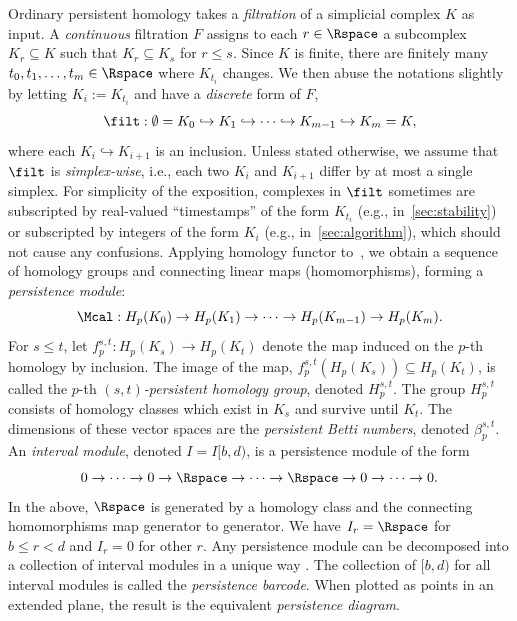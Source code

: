 Ordinary persistent homology takes a \emph{filtration} of a simplicial complex $K$ as input. A \emph{continuous}  filtration $F$  assigns to each $r\in \Rspace$ a subcomplex $K_r \subseteq K$ such that  $K_r \subseteq K_s$ for $r \leq s$. 
Since $K$ is finite, there are finitely many  $t_0,t_1, \ldots, t_m \in \Rspace$ where $K_{t_i}$ changes. 
 We then abuse the notations slightly by
letting $K_i := K_{t_i}$ and have a \emph{discrete} form of $F$,
\begin{equation}
\label{eq:fcomplex}
    \filt:\emptyset = K_0 \hookrightarrow K_1 \hookrightarrow \cdots \hookrightarrow K_{m-1} \hookrightarrow K_m=K,
\end{equation}
where
each $K_i \hookrightarrow K_{i+1}$ is an inclusion. 
Unless stated otherwise, we assume that $\filt$ is \emph{simplex-wise}, i.e., each 
two 
$K_i$ and $K_{i+1}$ differ by at most a single simplex. 
For simplicity of the exposition,
complexes in $\filt$ sometimes are
subscripted by real-valued ``timestamps'' of the form $K_{t_i}$ (e.g., in~\cref{sec:stability}) or subscripted by integers of the form $K_i$ (e.g., in~\cref{sec:algorithm}), which  should not cause any confusions.
Applying homology functor to~, we obtain a sequence of homology groups and connecting linear maps (homomorphisms), forming a \emph{persistence module}:
\begin{equation}\label{eq:fhomology}
\Mcal: H_p(K_0) \to H_p(K_1) \to  \cdots \to H_p(K_{m-1}) \to H_p(K_m).   
\end{equation} 
For $s\leq t$, let $f^{s,t}_p: H_p(K_s) \rightarrow H_p(K_t)$ denote the map induced on the $p$-th homology by  inclusion.
The image of the map, $f^{s,t}_p(H_p(K_s)) \subseteq H_p(K_t)$, is called the $p$-th \emph{$(s,t)$-persistent homology group}, denoted $H_p^{s,t}$. The group $H_p^{s,t}$
consists of homology classes which exist in $K_s$ and survive until $K_t$. The dimensions of these vector spaces are the \emph{persistent Betti numbers}, denoted $\beta^{s,t}_p$.
An \emph{interval module}, denoted $I=I[b,d)$, is a persistence module of the form
\[ 0 \rightarrow \cdots \rightarrow 0 \rightarrow \Rspace \rightarrow \cdots \rightarrow \Rspace \rightarrow 0 \rightarrow \cdots \rightarrow 0.\]
In the above, $\Rspace$ is generated by a homology class and the connecting homomorphisms map generator to generator. 
We have $I_r = \Rspace$
for $b \leq r < d$ and $I_r=0$ for other $r$. 
Any persistence module can be decomposed into a collection of interval modules in a unique way \cite{LuoHenselman-Petrusek2023}. 
The collection of $[b,d)$ for all interval modules is called the \emph{persistence barcode}. 
When plotted as points in an extended plane, the result is the equivalent \emph{persistence diagram}. 
 

